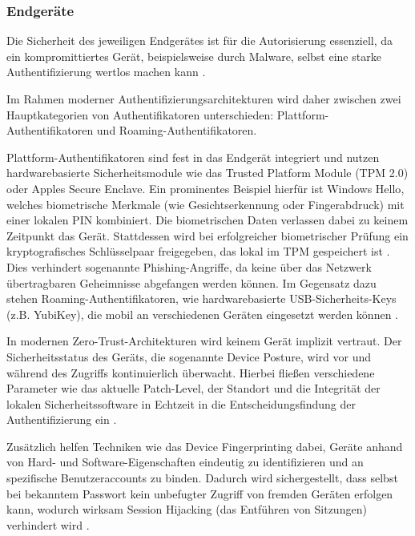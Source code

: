 \subsubsection{Endgeräte}


Die Sicherheit des jeweiligen Endgerätes ist für die Autorisierung essenziell, da ein kompromittiertes Gerät, beispielsweise durch Malware, selbst eine starke Authentifizierung wertlos machen kann \cite[S. 269]{ulqinaku2021}. 

Im Rahmen moderner Authentifizierungsarchitekturen wird daher zwischen zwei Hauptkategorien von Authentifikatoren unterschieden: Plattform-Authentifikatoren und Roaming-Authentifikatoren.

Plattform-Authentifikatoren sind fest in das Endgerät integriert und nutzen hardwarebasierte Sicherheitsmodule wie das {Trusted Platform Module} (TPM 2.0) oder Apples {Secure Enclave}. Ein prominentes Beispiel hierfür ist {Windows Hello}, welches biometrische Merkmale (wie Gesichtserkennung oder Fingerabdruck) mit einer lokalen PIN kombiniert. Die biometrischen Daten verlassen dabei zu keinem Zeitpunkt das Gerät. Stattdessen wird bei erfolgreicher biometrischer Prüfung ein kryptografisches Schlüsselpaar freigegeben, das lokal im TPM gespeichert ist \cite[S. 80]{keil2024}. Dies verhindert sogenannte Phishing-Angriffe, da keine über das Netzwerk übertragbaren Geheimnisse abgefangen werden können. Im Gegensatz dazu stehen Roaming-Authentifikatoren, wie hardwarebasierte USB-Sicherheits-Keys (z.B. YubiKey), die mobil an verschiedenen Geräten eingesetzt werden können \cite[S. 343]{ciolino2019}.

In modernen {Zero-Trust}-Architekturen wird keinem Gerät implizit vertraut. Der Sicherheitsstatus des Geräts, die sogenannte {Device Posture}, wird vor und während des Zugriffs kontinuierlich überwacht. Hierbei fließen verschiedene Parameter wie das aktuelle Patch-Level, der Standort und die Integrität der lokalen Sicherheitssoftware in Echtzeit in die Entscheidungsfindung der Authentifizierung ein \cite[S. 146]{otta2023}. 

Zusätzlich helfen Techniken wie das {Device Fingerprinting} dabei, Geräte anhand von Hard- und Software-Eigenschaften eindeutig zu identifizieren und an spezifische Benutzeraccounts zu binden. Dadurch wird sichergestellt, dass selbst bei bekanntem Passwort kein unbefugter Zugriff von fremden Geräten erfolgen kann, wodurch wirksam {Session Hijacking} (das Entführen von Sitzungen) verhindert wird \cite[S. 138]{wiefling2019}.

